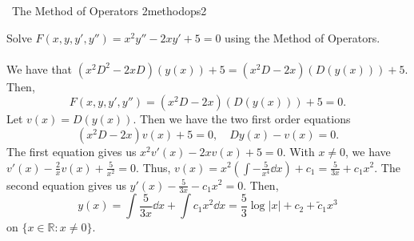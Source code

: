         \begin{example}{\Difficulty\,\Difficulty\,\,The Method of Operators 2}{methodops2}

            Solve \(F(x,y,y',y'')=x^2y''-2xy'+5=0\) using the Method of Operators.
            \\
            \\
            We have that \((x^2D^2-2xD)(y(x))+5=(x^2D-2x)(D(y(x)))+5\). Then,
            \begin{equation*}
                F(x,y,y',y'')=(x^2D-2x)(D(y(x)))+5=0.
            \end{equation*}
            Let \(v(x)=D(y(x))\). Then we have the two first order equations
            \begin{equation*}
                (x^2D-2x)v(x)+5=0,\quad Dy(x)-v(x)=0.
            \end{equation*}
            The first equation gives us \(x^2v'(x)-2xv(x)+5=0\). With \(x\neq 0\), we have \(v'(x)-\frac{2}{x}v(x)+\frac{5}{x^2}=0\). Thus,
            \(v(x)=x^2\left(\int -\frac{5}{x^4}\dd x\right)+c_1=\frac{5}{3x}+c_1x^2\). The second equation gives us \(y'(x)-\frac{5}{3x}-c_1x^2=0\). Then,
            \begin{equation*}
                y(x)=\int \frac{5}{3x}\dd x+\int c_1x^2\dd x=\frac{5}{3}\log|x|+c_2+\tilde{c}_1x^3
            \end{equation*}
            on \(\{x\in\mathbb{R}:x\neq0\}\).

        \end{example}